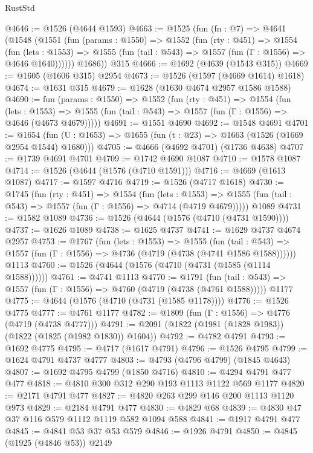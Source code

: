\begin{lexlean}{RustStd}
\begin{coremodule}
@4646 := @1526 (@4644 @1593)
@4663 := @1525
    (fun (fn : @7) =>
    @4641
      (@1548
        (@1551
          (fun (params : @1550) =>
          @1552
            (fun (rty : @451) =>
            @1554
              (fun (lets : @1553) =>
              @1555 (fun (tail : @543) => @1557 (fun (Γ : @1556) => @4646 @1640))))))
        @1686))
    @315
@4666 := @1692 (@4639 (@1543 @315))
@4669 := @1605 (@1606 @315) @2954
@4673 := @1526 (@1597 (@4669 @1614) @1618)
@4674 := @1631 @315
@4679 := @1628 (@1630 @4674 @2957 @1586 @1588)
@4690 := fun (params : @1550) =>
  @1552
    (fun (rty : @451) =>
    @1554
      (fun (lets : @1553) =>
      @1555 (fun (tail : @543) => @1557 (fun (Γ : @1556) => @4646 (@4673 @4679)))))
@4691 := @1551 @4690
@4692 := @1548 @4691
@4701 := @1654 (fun (U : @1653) => @1655 (fun (t : @23) => @1663 (@1526 (@1669 @2954 @1544) @1680)))
@4705 := @4666 (@4692 @4701) (@1736 @4638)
@4707 := @1739 @4691 @4701
@4709 := @1742 @4690 @1087
@4710 := @1578 @1087
@4714 := @1526 (@4644 (@1576 (@4710 @1591)))
@4716 := @4669 (@1613 @1087)
@4717 := @1597 @4716
@4719 := @1526 (@4717 @1618)
@4730 := @1745
    (fun (rty : @451) =>
    @1554
      (fun (lets : @1553) =>
      @1555 (fun (tail : @543) => @1557 (fun (Γ : @1556) => @4714 (@4719 @4679)))))
    @1089
@4731 := @1582 @1089
@4736 := @1526 (@4644 (@1576 (@4710 (@4731 @1590))))
@4737 := @1626 @1089
@4738 := @1625 @4737
@4741 := @1629 @4737 @4674 @2957
@4753 := @1767
    (fun (lets : @1553) =>
    @1555
      (fun (tail : @543) => @1557 (fun (Γ : @1556) => @4736 (@4719 (@4738 (@4741 @1586 @1588))))))
    @1113
@4760 := @1526 (@4644 (@1576 (@4710 (@4731 (@1585 (@1114 @1588))))))
@4761 := @4741 @1113
@4770 := @1791
    (fun (tail : @543) => @1557 (fun (Γ : @1556) => @4760 (@4719 (@4738 (@4761 @1588)))))
    @1177
@4775 := @4644 (@1576 (@4710 (@4731 (@1585 @1178))))
@4776 := @1526 @4775
@4777 := @4761 @1177
@4782 := @1809 (fun (Γ : @1556) => @4776 (@4719 (@4738 @4777)))
@4791 := @2091 (@1822 (@1981 (@1828 @1983)) (@1822 (@1825 (@1982 @1830)) @1604))
@4792 := @4782 @4791
@4793 := @1692 @4775
@4795 := @4717 (@1617 @4791)
@4796 := @1526 @4795
@4799 := @1624 @4791 @4737 @4777
@4803 := @4793 (@4796 @4799) (@1845 @4643)
@4807 := @1692 @4795 @4799 (@1850 @4716)
@4810 := @4294 @4791 @477 @477
@4818 := @4810 @300 @312 @290 @193 @1113 @1122 @569 @1177
@4820 := @2171 @4791 @477
@4827 := @4820 @263 @299 @146 @200 @1113 @1120 @973
@4829 := @2184 @4791 @477
@4830 := @4829 @68
@4839 := @4830 @47 @37 @116 @579 @1112 @1119 @582 @1094 @588
@4841 := @1917 @4791 @477
@4845 := @4841 @53 @37 @53 @579
@4846 := @1926 @4791
@4850 := @4845 (@1925 (@4846 @53)) @2149

\end{coremodule}
\end{lexlean}
